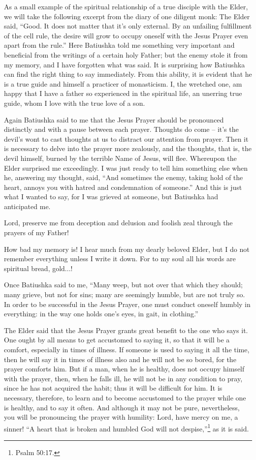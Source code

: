 \begin{longquote}{As a small example of the spiritual relationship of a true disciple with the Elder, we will take the following excerpt from the diary of one diligent monk:}
The Elder said, ``Good. It does not matter that it's only external. By an unfailing fulfillment of the cell rule, the desire will grow to occupy oneself with the Jesus Prayer even apart from the rule.'' Here Batiushka told me something very important and beneficial from the writings of a certain holy Father; but the enemy stole it from my memory, and I have forgotten what was said. It is surprising how Batiushka can find the right thing to say immediately. From this ability, it is evident that he is a true guide and himself a practicer of monasticism. I, the wretched one, am happy that I have a father so experienced in the spiritual life, an unerring true guide, whom I love with the true love of a son.

Again Batiushka said to me that the Jesus Prayer should be pronounced distinctly and with a pause between each prayer. Thoughts do come -- it's the devil's wont to cast thoughts at us to distract our attention from prayer. Then it is necessary to delve into the prayer more zealously, and the thoughts, that is, the devil himself, burned by the terrible Name of Jesus, will flee. Whereupon the Elder surprised me exceedingly. I was just ready to tell him something else when he, answering my thought, said, ``And sometimes the enemy, taking hold of the heart, annoys you with hatred and condemnation of someone.'' And this is just what I wanted to say, for I was grieved at someone, but Batiushka had anticipated me.

Lord, preserve me from deception and delusion and foolish zeal through the prayers of my Father!

How bad my memory is! I hear much from my dearly beloved Elder, but I do not remember everything unless I write it down. For to my soul all his words are spiritual bread, gold...!

Once Batiushka said to me, ``Many weep, but not over that which they should; many grieve, but not for sins; many are seemingly humble, but are not truly so. In order to be successful in the Jesus Prayer, one must conduct oneself humbly in everything: in the way one holds one's eyes, in gait, in clothing.''

The Elder said that the Jesus Prayer grants great benefit to the one who says it. One ought by all means to get accustomed to saying it, so that it will be a comfort, especially in times of illness. If someone is used to saying it all the time, then he will say it in times of illness also and he will not be so bored, for the prayer comforts him. But if a man, when he is healthy, does not occupy himself with the prayer, then, when he falls ill, he will not be in any condition to pray, since he has not acquired the habit; thus it will be difficult for him. It is necessary, therefore, to learn and to become accustomed to the prayer while one is healthy, and to say it often. And although it may not be pure, nevertheless, you will be pronouncing the prayer with humility: Lord, have mercy on me, a sinner! ``A heart that is broken and humbled God will not despise,''\footnote{Psalm 50:17.} as it is said.


\end{longquote}
